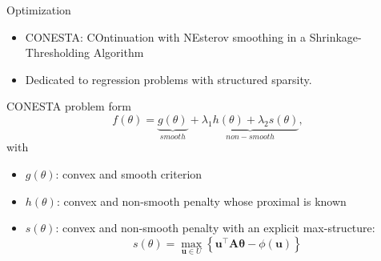 \documentclass[11pt]{beamer}
\begin{document}
\begin{frame}{Optimization}
\begin{itemize}
	\item CONESTA: COntinuation with NEsterov smoothing in a Shrinkage-Thresholding Algorithm \citep{hadjselem2018}
	\item Dedicated to regression problems with structured sparsity.
\end{itemize}

\textcolor{Framaprune}{CONESTA problem form}
$$ f(\theta ) = \underbrace{g(\theta)}_{smooth} + \underbrace{\lambda_1 h(\theta) + \lambda_2 s(\theta)}_{non-smooth}, $$
with 
\begin{itemize}
	\item $g(\theta)$: convex and smooth criterion %
	\item $h(\theta)$: convex and non-smooth penalty whose proximal is known
	\item $s(\theta)$: convex and non-smooth penalty with an explicit max-structure:
	$$s(\theta)= \max_{\mathbf u \in U} \left \{\mathbf u^\top \mathbf A \mathbf \theta - \phi(\mathbf u) \right \}$$
\end{itemize}
\end{frame}  
\end{document}
